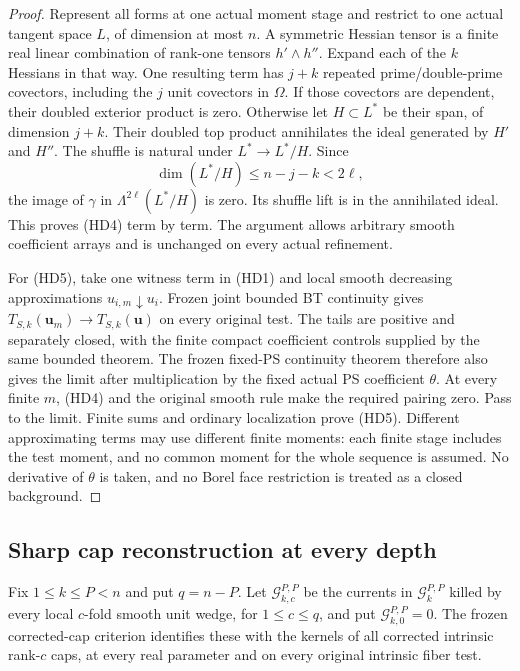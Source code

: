 \documentclass[11pt,a4paper]{article}
\numberwithin{equation}{section}
\theoremstyle{definition}
\theoremstyle{remark}
\begin{document}
\begin{proof}
Represent all forms at one actual moment stage and restrict to one
actual tangent space $L$, of dimension at most $n$. A symmetric
Hessian tensor is a finite real linear combination of rank-one
tensors $h'\wedge h''$. Expand each of the $k$ Hessians in that
way. One resulting term has $j+k$ repeated prime/double-prime
covectors, including the $j$ unit covectors in $\Omega$.
If those covectors are dependent, their doubled exterior product
is zero. Otherwise let $H\subset L^*$ be their span, of dimension
$j+k$. Their doubled top product annihilates the ideal generated
by $H'$ and $H''$. The shuffle is natural under $L^*\to L^*/H$.
Since
\[
                      \dim(L^*/H)\le n-j-k<2\ell,
\]
the image of $\gamma$ in $\Lambda^{2\ell}(L^*/H)$ is zero.
Its shuffle lift is in the annihilated ideal. This proves (HD4)
term by term. The argument allows arbitrary smooth coefficient
arrays and is unchanged on every actual refinement.

For (HD5), take one witness term in (HD1) and local smooth decreasing
approximations $u_{i,m}\downarrow u_i$. Frozen joint bounded BT
continuity gives
$T_{S,k}(\mathbf u_m)\to T_{S,k}(\mathbf u)$ on every original
test. The tails are positive and separately closed, with the finite
compact coefficient controls supplied by the same bounded theorem.
The frozen fixed-PS continuity theorem therefore also gives the
limit after multiplication by the fixed actual PS coefficient
$\theta$. At every finite $m$, (HD4) and the original smooth rule
make the required pairing zero. Pass to the limit. Finite sums and
ordinary localization prove (HD5). Different approximating terms
may use different finite moments: each finite stage includes the
test moment, and no common moment for the whole sequence is assumed.
No derivative of $\theta$ is taken, and no Borel face restriction is
treated as a closed background.
\end{proof}

\subsection{Sharp cap reconstruction at every depth}

Fix $1\le k\le P<n$ and put $q=n-P$. Let
$\mathscr G_{k,c}^{P,P}$ be the currents in
$\mathscr G_k^{P,P}$ killed by every local $c$-fold smooth unit
wedge, for $1\le c\le q$, and put $\mathscr G_{k,0}^{P,P}=0$.
The frozen corrected-cap criterion identifies these with the
kernels of all corrected intrinsic rank-$c$ caps, at every real
parameter and on every original intrinsic fiber test.
\end{document}
